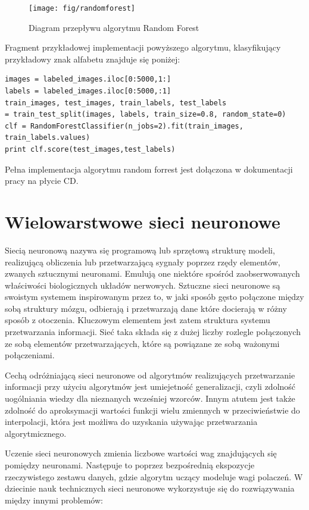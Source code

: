 \documentclass[brudnopis]{xmgr}
\begin{document}
\newpage

\begin{figure}[!tbh]
\centering
\texttt{[image: fig/randomforest]}
\caption{Diagram przepływu algorytmu Random Forest}
\end{figure}

Fragment przykładowej implementacji powyższego algorytmu, klasyfikujący przykładowy znak alfabetu znajduje się poniżej:

\begin{verbatim}
images = labeled_images.iloc[0:5000,1:]
labels = labeled_images.iloc[0:5000,:1]
train_images, test_images, train_labels, test_labels 
= train_test_split(images, labels, train_size=0.8, random_state=0)
clf = RandomForestClassifier(n_jobs=2).fit(train_images, train_labels.values)
print clf.score(test_images,test_labels)
\end{verbatim}

Pełna implementacja algorytmu random forrest jest dołączona w dokumentacji pracy na płycie CD. 

\section{Wielowarstwowe sieci neuronowe}

Siecią neuronową nazywa się programową lub sprzętową strukturę modeli, realizującą obliczenia lub przetwarzającą sygnały poprzez rzędy elementów, zwanych sztucznymi neuronami. Emulują one niektóre spośród zaobserwowanych właściwości biologicznych układów nerwowych. Sztuczne sieci neuronowe są swoistym systemem inspirowanym przez to, w jaki sposób gęsto połączone między sobą struktury mózgu, odbierają i przetwarzają dane które docierają w różny sposób z otoczenia. Kluczowym elementem jest zatem struktura systemu przetwarzania informacji. Sieć taka składa się z dużej liczby rozlegle połączonych ze sobą elementów przetwarzających, które są powiązane ze sobą ważonymi połączeniami.

Cechą odróżniającą sieci neuronowe od algorytmów realizujących przetwarzanie informacji przy użyciu algorytmów jest umiejetność generalizacji, czyli zdolność uogólniania wiedzy dla nieznanych wcześniej wzorców. Innym atutem jest także zdolność do aproksymacji wartości funkcji wielu zmiennych w przeciwieństwie do interpolacji, która jest możliwa do uzyskania używając przetwarzania algorytmicznego.

Uczenie sieci neuronowych zmienia liczbowe wartości wag znajdujących się pomiędzy neuronami. Następuje to poprzez bezpośrednią ekspozycje rzeczywistego zestawu danych, gdzie algorytm uczący modeluje wagi polaczeń. W dziecinie nauk technicznych sieci neuronowe wykorzystuje się do rozwiązywania między innymi problemów:
\end{document}
